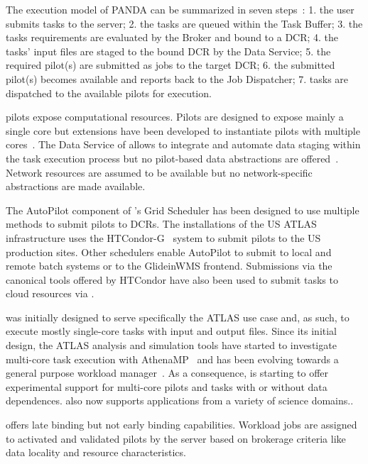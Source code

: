 \documentclass{sig-alternate}
\begin{document}
The execution model of PANDA can be summarized in seven
steps~\cite{nilsson2011atlas,pandarun_url}: 1. the user submits tasks to the
\panda server; 2. the tasks are queued within the Task Buffer; 3. the tasks
requirements are evaluated by the Broker and bound to a DCR; 4. the tasks' input
files are staged to the bound DCR by the Data Service; 5. the required pilot(s)
are submitted as jobs to the target DCR; 6. the submitted pilot(s) becomes
available and reports back to the Job Dispatcher; 7. tasks are dispatched to the
available pilots for execution.


\panda pilots expose computational resources. Pilots are designed to expose
mainly a single core but extensions have been developed to instantiate pilots
with multiple cores~\cite{crooks2012multi}. The Data Service of \panda allows to
integrate and automate data staging within the task execution process but no
pilot-based data abstractions are offered~\cite{maeno2012pd2p}. Network
resources are assumed to be available but no network-specific abstractions are
made available.

The AutoPilot component of \panda's Grid Scheduler has been designed to use
multiple methods to submit pilots to DCRs. The \panda installations of the US
ATLAS infrastructure uses the HTCondor-G~\cite{frey2002condorG} system to submit
pilots to the US production sites. Other schedulers enable AutoPilot to submit
to local and remote batch systems or to the GlideinWMS frontend. Submissions via
the canonical tools offered by HTCondor have also been used to submit tasks to
cloud resources via
\panda.

\panda was initially designed to serve specifically the ATLAS use case and, as
such, to execute mostly single-core tasks with input and output files. Since its
initial design, the ATLAS analysis and simulation tools have started to
investigate multi-core task execution with AthenaMP~\cite{crooks2012multi} and
\panda has been evolving towards a general purpose workload
manager~\cite{maeno2014evolution}. As a consequence, \panda is starting to offer
experimental support for multi-core pilots and tasks with or without data
dependences. \panda also now supports applications from a variety of science
domains.\cite{x,y}.

\panda offers late binding but not early binding capabilities. Workload jobs are
assigned to activated and validated pilots by the \panda server based on
brokerage criteria like data locality and resource characteristics.
\end{document}
